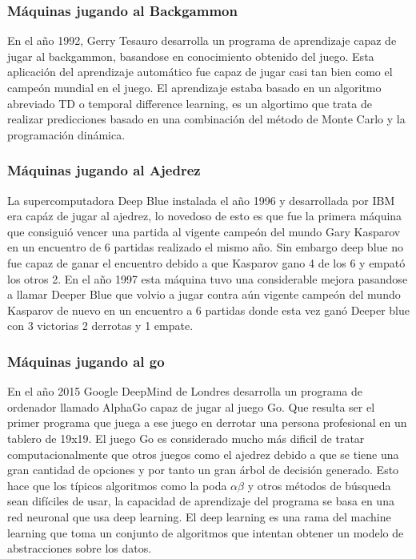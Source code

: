 \documentclass[a4paper, 11pt]{article} %
\begin{document}
\subsubsection{Máquinas jugando al Backgammon}
En el año 1992, Gerry Tesauro desarrolla un programa de aprendizaje capaz de jugar al backgammon, basandose en conocimiento obtenido del juego. Esta aplicación del aprendizaje automático fue capaz de jugar casi tan bien como el campeón mundial en el juego. El aprendizaje estaba basado en un algoritmo abreviado TD o temporal difference learning, es un algortimo que trata de realizar predicciones basado en una combinación del método de Monte Carlo y la programación dinámica.

\subsubsection{Máquinas jugando al Ajedrez}
La supercomputadora Deep Blue instalada el año 1996 y desarrollada por IBM era capáz de jugar al ajedrez, lo novedoso de esto es que fue la primera máquina que consiguió vencer una partida al vigente campeón del mundo Gary Kasparov en un encuentro de 6 partidas realizado el mismo año. Sin embargo deep blue no fue capaz de ganar el encuentro debido a que Kasparov gano 4 de los 6 y empató los otros 2. En el año 1997 esta máquina tuvo una considerable mejora pasandose a llamar Deeper Blue que volvio a jugar contra aún vigente campeón del mundo Kasparov de nuevo en un encuentro a 6 partidas donde esta vez ganó Deeper blue con 3 victorias 2 derrotas y 1 empate.

\subsubsection{Máquinas jugando al go}
En el año 2015 Google DeepMind de Londres desarrolla un programa de ordenador llamado AlphaGo capaz de jugar al juego Go. Que resulta ser el primer programa que juega a ese juego en derrotar una persona profesional en un tablero de 19x19. El juego Go es considerado mucho más dificil de tratar computacionalmente que otros juegos como el ajedrez debido a que se tiene una gran cantidad de opciones y por tanto un gran árbol de decisión generado. Esto hace que los típicos algoritmos como la poda $\alpha\beta$ y otros métodos de búsqueda sean difíciles de usar, la capacidad de aprendizaje del programa se basa en una red neuronal que usa deep learning. El deep learning es una rama del machine learning que toma un conjunto de algoritmos que intentan obtener un modelo de abstracciones sobre los datos.
\end{document}
